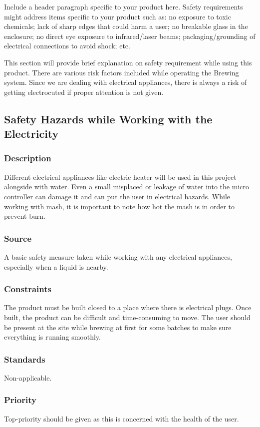 Include a header paragraph specific to your product here. Safety requirements might address items specific to your product such as: no exposure to toxic chemicals; lack of sharp edges that could harm a user; no breakable glass in the enclosure; no direct eye exposure to infrared/laser beams; packaging/grounding of electrical connections to avoid shock; etc.

This section will provide brief explanation on safety requirement while using this product. There are various risk factors included while operating the Brewing system. Since we are dealing with electrical appliances, there is always a risk of getting electrocuted if proper attention is not given. 

\subsection{Safety Hazards while Working with the Electricity}
\subsubsection{Description}
Different electrical appliances like electric heater will be used in this project alongside with water. Even a small misplaced or leakage of water into the micro controller can damage it and can put the user in electrical hazards. While working with mash, it is important to note how hot the mash is in order to prevent burn.

\subsubsection{Source}
A basic safety measure taken while working with any electrical appliances, especially when a liquid is nearby.

\subsubsection{Constraints}
The product must be built closed to a place where there is electrical plugs. Once built, the product can be difficult and time-consuming to move. The user should be present at the site while brewing at first for some batches to make sure everything is running smoothly.

\subsubsection{Standards}
Non-applicable.

\subsubsection{Priority}
Top-priority should be given as this is concerned with the health of the user.


